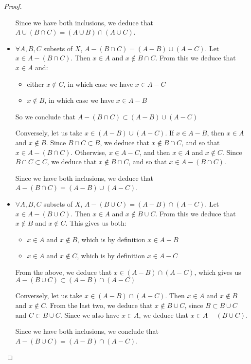 \documentclass[11pt,a4paper,twoside]{article}
\theoremstyle{definition}
\begin{document}
\begin{proof}
\begin{itemize}
    Since we have both inclusions, we deduce that $A \cup (B \cap C) = (A \cup B) \cap (A \cup C)$.

  \item $\forall A, B, C$ subsets of $X$, $A - (B \cap C) = (A - B) \cup (A - C)$.
    Let $x \in A - (B \cap C)$. Then $x \in A$ and $x \notin B \cap C$. From this we deduce that $x \in A$ and:
    \begin{itemize}
    \item either $x \notin C$, in which case we have $x \in A - C$
    \item $x \notin B$, in which case we have $x \in A - B$
    \end{itemize}
    So we conclude that $A - (B \cap C) \subset (A - B) \cup (A - C)$

    Conversely, let us take $x \in (A - B) \cup (A - C)$.
    If $x \in A - B$, then $x \in A$ and $x \notin B$. Since $B \cap C \subset B$, we deduce that $x \notin B \cap C$, and so that $x \in A - (B \cap C)$.
    Otherwise, $x \in A - C$, and then $x \in A$ and $x \notin C$. Since $B \cap C \subset C$, we deduce that $x \notin B \cap C$, and so that $x \in A - (B \cap C)$.

    Since we have both inclusions, we deduce that $A - (B \cap C) = (A - B) \cup (A - C)$.

  \item $\forall A, B, C$ subsets of $X$, $A - (B \cup C) = (A - B) \cap (A - C)$.
    Let $x \in A - (B \cup C)$. Then $x \in A$ and $x \notin B \cup C$. From this we deduce that $x \notin B$ and $x \notin C$.
    This gives us both:
    \begin{itemize}
    \item $x \in A$ and $x \notin B$, which is by definition $x \in A - B$
    \item $x \in A$ and $x \notin C$, which is by definition $x \in A - C$
    \end{itemize}
    From the above, we deduce that $x \in (A - B) \cap (A - C)$, which gives us $A - (B \cup C) \subset (A - B) \cap (A - C)$

    Conversely, let us take $x \in (A - B) \cap (A - C)$. Then $x \in A$ and $x \notin B$ and $x \notin C$.
    From the last two, we deduce that $x \notin B \cup C$, since $B \subset B \cup C$ and $C \subset B \cup C$.
    Since we also have $x \in A$, we deduce that $x \in A - (B \cup C)$.

    Since we have both inclusions, we conclude that $A - (B \cup C) = (A - B) \cap (A - C)$.
  \end{itemize}
\end{proof}
\end{document}

